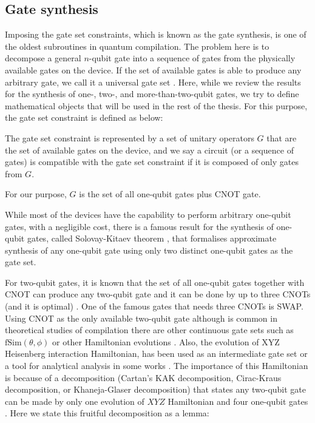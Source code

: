 \subsection{Gate synthesis}

Imposing the gate set constraints, which is known as the gate synthesis, is one of the oldest subroutines in quantum compilation. The problem here is to decompose a general $n$-qubit gate into a sequence of gates from the physically available gates on the device. If the set of available gates is able to produce any arbitrary gate, we call it a universal gate set \cite{barenco1995}. Here, while we review the results for the synthesis of one-, two-, and more-than-two-qubit gates, we try to define mathematical objects that will be used in the rest of the thesis. For this purpose, the gate set constraint is defined as below:

\begin{definition}
  The gate set constraint is represented by a set of unitary operators $G$ that are the set of available gates on the device, and we say a circuit (or a sequence of gates) is compatible with the gate set constraint if it is composed of only gates from $G$.

  For our purpose, $G$ is the set of all one-qubit gates plus CNOT gate.
\end{definition}

While most of the devices have the capability to perform arbitrary one-qubit gates, with a negligible cost, there is a famous result for the synthesis of one-qubit gates, called Solovay-Kitaev theorem \cite{dawson2006}, that formalises approximate synthesis of any one-qubit gate using only two distinct one-qubit gates as the gate set.

For two-qubit gates, it is known that the set of all one-qubit gates together with CNOT can produce any two-qubit gate and it can be done by up to three CNOTs (and it is optimal) \cite{vatan2004,vidal2004}. One of the famous gates that needs three CNOTs is SWAP. Using CNOT as the only available two-qubit gate although is common in theoretical studies of compilation \cite{zulehner2018,siraichi2018,li2019,zhang2021,itoko2019,murali2019} there are other continuous gate sets such as $\mathrm{fSim}(\theta, \phi)$ \cite{foxen2020} or other Hamiltonian evolutions \cite{childsa}. Also, the evolution of XYZ Heisenberg interaction Hamiltonian, has been used as an intermediate gate set or a tool for analytical analysis in some works \cite{sousa2006,vidal2004}. The importance of this Hamiltonian is because of a decomposition (Cartan's KAK decomposition, Cirac-Kraus decomposition, or Khaneja-Glaser decomposition) that states any two-qubit gate can be made by only one evolution of $XYZ$ Hamiltonian and four one-qubit gates \cite{kraus2001,khaneja2001}. Here we state this fruitful decomposition as a lemma:

